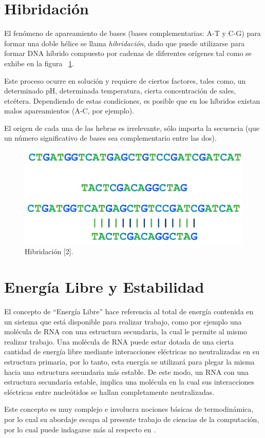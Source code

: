 \vskip 15cm
\section{Hibridación}
\par El fenómeno de apareamiento de bases (bases complementarias: A-T y C-G) para formar una doble hélice se llama \emph{hibridación}, dado que puede utilizarse para formar DNA híbrido compuesto por cadenas de diferentes orígenes tal como se exhibe en la figura ~\ref{hibridacion}.

\par Este proceso ocurre en solución y requiere de ciertos factores, tales como, un determinado pH, determinada temperatura, cierta concentración de sales, etcétera. Dependiendo de estas condiciones, es posible que en los híbridos existan malos apareamientos (A-C, por ejemplo).

\par El origen de cada una de las hebras es irrelevante, sólo importa la secuencia (que un número significativo de bases sea complementario entre las dos).

\begin{figure}[h!]
	\centering
		\includegraphics[scale=0.27]{image/hibridacion.png}
	\caption{Hibridación [2].}
	\label{hibridacion} 
\end{figure} 

\section{Energía Libre y Estabilidad} 
\par El concepto de ``Energía Libre'' hace referencia al total de energía contenida en un sistema que está disponible para realizar trabajo, como por ejemplo una molécula de RNA con una estructura secundaria, la cual le permite al mismo realizar trabajo. Una molécula de RNA puede estar dotada de una cierta cantidad de energía libre mediante interacciones eléctricas no neutralizadas en su estructura primaria, por lo tanto, esta energía se utilizará para plegar la misma hacia una estructura secundaria más estable. De este modo, un RNA con una estructura secundaria estable, implica una molécula en la cual sus interacciones eléctricas entre nucleótidos se hallan completamente neutralizadas. 
\par Este concepto es muy complejo e involucra nociones básicas de termodinámica, por lo cual su abordaje escapa al presente trabajo de ciencias de la computación, por lo cual puede indagarse más al respecto en \cite{energialibre}. 

